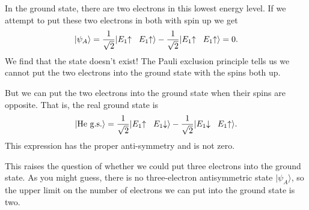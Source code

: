 In the ground state, there are two electrons in this lowest
energy level.  If we attempt to put these two electrons in both with
spin up we get
\begin{equation}
  |\psi_A\rangle = \frac{1}{\sqrt 2}|E_1\hspace{-1mm}\uparrow\hspace{2mm} 
  E_1\hspace{-1mm}\uparrow\rangle 
  - \frac{1}{\sqrt 2}|E_1\hspace{-1mm}\uparrow\hspace{2mm} 
  E_1\hspace{-1mm}\uparrow\rangle 
  = 0.
\end{equation}
We find that the state doesn't exist!  The Pauli exclusion principle
tells us we cannot put the two electrons into the ground state with
the spins both up.

But we can put the two electrons into the ground state when their spins
are opposite.  That is, the real ground state is
\begin{equation}
  |\text{He g.s.}\rangle = 
  \frac{1}{\sqrt 2}|E_1\hspace{-1mm}\uparrow\hspace{2mm} 
    E_1\hspace{-1mm}\downarrow\rangle -
  \frac{1}{\sqrt 2}|E_1\hspace{-1mm}\downarrow\hspace{2mm} 
    E_1\hspace{-1mm}\uparrow\rangle.
    \label{eq:helium_ground_state}
\end{equation}
This expression has the proper anti-symmetry and is not zero.

This raises the question of whether we could put three electrons into
the ground state.  As you might guess, there is no three-electron
antisymmetric state $|\psi_A\rangle$, so the upper limit on the number
of electrons we can put into the ground state is two.

